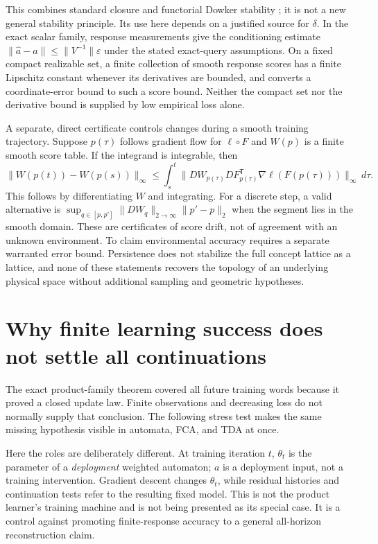\documentclass[11pt]{article}
\theoremstyle{definition}\newtheorem{definition}[theorem]{Definition}
\theoremstyle{remark}\newtheorem{remark}[theorem]{Remark}
\begin{document}
This combines standard closure and functorial Dowker stability
\cite{ayzenberg,brun,dowker}; it is not a new general stability principle.
Its use here depends on a justified source for $\delta$. In the exact
scalar family, response measurements give the conditioning estimate
$\|\widehat a-a\|\leq\|V^{-1}\|\varepsilon$ under the stated exact-query
assumptions. On a fixed compact realizable set, a finite collection of
smooth response scores has a finite Lipschitz constant whenever its
derivatives are bounded, and converts a coordinate-error bound to such
a score bound. Neither the compact set nor the derivative bound is
supplied by low empirical loss alone.

A separate, direct certificate controls changes during a smooth training
trajectory. Suppose $p(\tau)$ follows gradient flow for $\ell\circ F$ and
$W(p)$ is a finite smooth score table. If the integrand is integrable, then
\[
 \|W(p(t))-W(p(s))\|_\infty
 \leq\int_s^t
 \|DW_{p(\tau)}DF_{p(\tau)}^{\mathsf T}
               \nabla\ell(F(p(\tau)))\|_\infty\,d\tau.
\]
This follows by differentiating $W$ and integrating. For a discrete step,
a valid alternative is
$\sup_{q\in[p,p']}\|DW_q\|_{2\to\infty}\|p'-p\|_2$ when the segment
lies in the smooth domain. These are certificates of score drift, not of
agreement with an unknown environment. To claim environmental accuracy
requires a separate warranted error bound. Persistence does not stabilize
the full concept lattice as a lattice, and none of these statements
recovers the topology of an underlying physical space without additional
sampling and geometric hypotheses.


\section{Why finite learning success does not settle all continuations}
The exact product-family theorem covered all future training words because
it proved a closed update law. Finite observations and decreasing loss do
not normally supply that conclusion. The following stress test makes the
same missing hypothesis visible in automata, FCA, and TDA at once.

Here the roles are deliberately different. At training iteration $t$,
$\theta_t$ is the parameter of a \emph{deployment} weighted automaton;
$a$ is a deployment input, not a training intervention. Gradient descent
changes $\theta_t$, while residual histories and continuation tests refer
to the resulting fixed model. This is not the product learner's training
machine and is not being presented as its special case. It is a control
against promoting finite-response accuracy to a general all-horizon
reconstruction claim.
\end{document}
